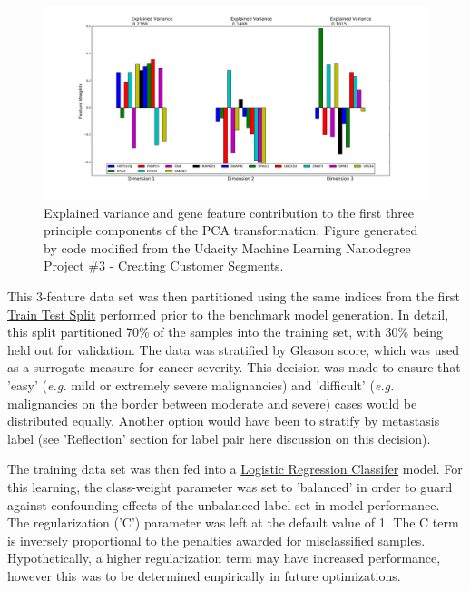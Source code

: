 \documentclass[final]{article}
\begin{document}
\begin{figure}[h]
  \centering
  \includegraphics[width=\textwidth]{pcaEV}
  \caption{\label{fig:pcaEV}Explained variance and gene feature contribution to the first three principle
  components of the PCA transformation. Figure generated by code modified from
  the Udacity Machine Learning Nanodegree Project \#3 - Creating Customer Segments.}
\end{figure}

This 3-feature data set was then partitioned using the same indices from the
first
\href{http://scikit-learn.org/stable/modules/generated/sklearn.cross_validation.train_test_split.html}{Train
Test Split} performed prior to the benchmark model generation.  In detail, this
split partitioned 70\% of the samples into the training set, with 30\% being
held out for validation.  The data was stratified by Gleason score, which was
used as a surrogate measure for cancer severity. This decision was made to
ensure that 'easy' (\textit{e.g.} mild or extremely severe malignancies) and
'difficult' (\textit{e.g.} malignancies on the border between moderate and
severe) cases would be distributed equally.  Another option would have been to
stratify by  metastasis label (see 'Reflection' section for  %
label pair here discussion on this decision).

The training data set was then fed into a
\href{http://scikit-learn.org/stable/modules/generated/sklearn.linear_model.LogisticRegression.html}{Logistic
Regression Classifer} model.  For this learning, the class-weight parameter was
set to 'balanced' in order to guard against confounding effects of the
unbalanced label set in model performance.  The regularization ('C') parameter
was left at the default value of 1.  The C term is inversely proportional to the
penalties awarded for misclassified samples. Hypothetically, a higher
regularization term may have increased performance, however this was to be
determined empirically in future optimizations.
\end{document}
